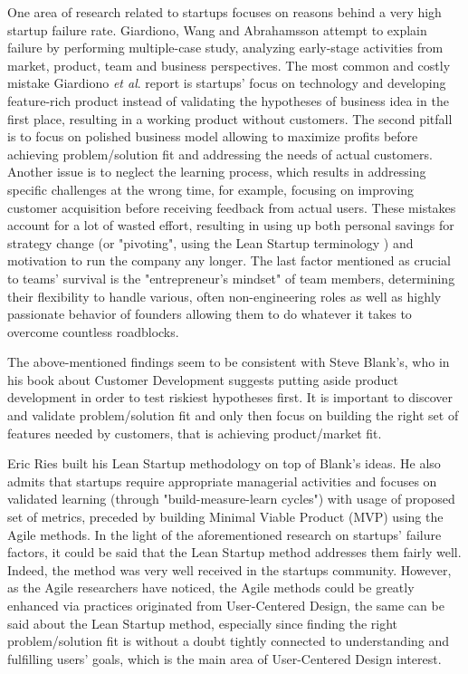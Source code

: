 \documentclass{article}
\begin{document}
One area of research related to startups focuses on reasons behind a very high startup failure rate. Giardiono, Wang and Abrahamsson \citep{giardino2014early} attempt to explain failure by performing multiple-case study, analyzing early-stage activities from market, product, team and business perspectives. The most common and costly mistake Giardiono \textit{et al}. report is startups' focus on technology and developing feature-rich product instead of validating the hypotheses of business idea in the first place, resulting in a working product without customers. The second pitfall is to focus on polished business model allowing to maximize profits before achieving problem/solution fit and addressing the needs of actual customers. Another issue is to neglect the learning process, which results in addressing specific challenges at the wrong time, for example, focusing on improving customer acquisition before receiving feedback from actual users. These mistakes account for a lot of wasted effort, resulting in using up both personal savings for strategy change (or "pivoting", using the Lean Startup terminology \citep{ries2011lean}) and motivation to run the company any longer. The last factor mentioned as crucial to teams' survival is the "entrepreneur's mindset" of team members, determining their flexibility to handle various, often non-engineering roles as well as highly passionate behavior of founders allowing them to do whatever it takes to overcome countless roadblocks.

The above-mentioned findings seem to be consistent with Steve Blank's, who in his book about Customer Development \citep{blank2013four} suggests putting aside product development in order to test riskiest hypotheses first. It is important to discover and validate problem/solution fit and only then focus on building the right set of features needed by customers, that is achieving product/market fit.

Eric Ries built his Lean Startup methodology \citep{ries2011lean} on top of Blank's ideas. He also admits that startups require appropriate managerial activities and focuses on validated learning (through "build-measure-learn cycles") with usage of proposed set of metrics, preceded by building Minimal Viable Product (MVP) using the Agile methods. In the light of the aforementioned research on startups' failure factors, it could be said that the Lean Startup method addresses them fairly well. Indeed, the method was very well received in the startups community. However, as the Agile researchers have noticed, the Agile methods could be greatly enhanced via practices originated from User-Centered Design, the same can be said about the Lean Startup method, especially since finding the right problem/solution fit is without a doubt tightly connected to understanding and fulfilling users' goals, which is the main area of User-Centered Design interest.
\end{document}

